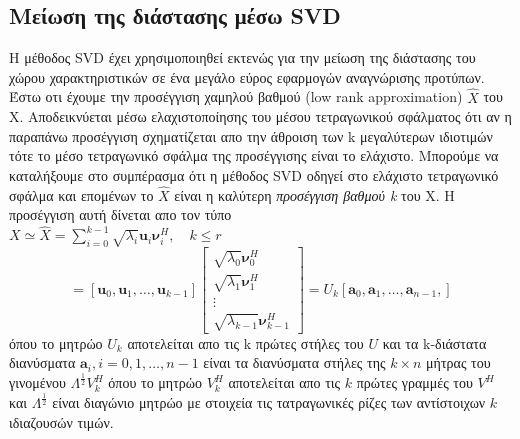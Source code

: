 \subsection{Μείωση της διάστασης μέσω \textlatin{SVD}}
\par
Η μέθοδος \textlatin{SVD} έχει χρησιμοποιηθεί εκτενώς για την μείωση της διάστασης του χώρου χαρακτηριστικών σε ένα μεγάλο εύρος εφαρμογών αναγνώρισης προτύπων. Έστω οτι έχουμε την προσέγγιση χαμηλού βαθμού \textlatin{(low rank approximation)} $ \hat{X} $ του \textlatin{X}. Αποδεικνύεται μέσω ελαχιστοποίησης του μέσου τετραγωνικού σφάλματος ότι αν η παραπάνω προσέγγιση σχηματίζεται απο την άθροιση των \textlatin{k} μεγαλύτερων ιδιοτιμών τότε το μέσο τετραγωνικό σφάλμα της προσέγγισης είναι το ελάχιστο. Μπορούμε να καταλήξουμε στο συμπέρασμα ότι η μέθοδος \textlatin{SVD} οδηγεί στο ελάχιστο τετραγωνικό σφάλμα και επομένων το $ \hat{X} $ είναι η καλύτερη \textit{προσέγγιση βαθμού \textlatin{k}} του \textlatin{X}. Η προσέγγιση αυτή δίνεται απο τον τύπο \\
\newline\hspace*{\fill}
$ X \simeq \hat{X} = \sum_{i=0}^{k-1} \sqrt{\lambda_{i}} \mathbf{u}_{i}\mathbf{\nu}_{i}^{H},\quad k \leq r $
\hspace*{\fill}\newline
\newline\hspace*{\fill}
\begin{equation}
	= [\mathbf{u}_{0},\mathbf{u}_{1},\ldots,\mathbf{u}_{k-1}]
	\begin{bmatrix}
	\sqrt{\lambda_{0}}\mathbf{\nu}_{0}^{H} \\
	\sqrt{\lambda_{1}}\mathbf{\nu}_{1}^{H} \\
	\vdots \\ 
	\sqrt{\lambda_{k-1}}\mathbf{\nu}_{k-1}^{H}
	\end{bmatrix} 
	= U_{k}[\mathbf{a}_{0},\mathbf{a}_{1},\ldots,\mathbf{a}_{n-1},]
\end{equation}
\hspace*{\fill}\newline
όπου το μητρώο $U_{k}$ αποτελείται απο τις \textlatin{k} πρώτες στήλες του $U$ και τα \textlatin{k}-διάστατα διανύσματα $\mathbf{a}_{i},i=0,1,\ldots,n-1$ είναι τα διανύσματα στήλες της $k \times n$ μήτρας του γινομένου $ \Lambda^{\frac{1}{2}}V_{k}^{H}$ όπου το μητρώο $V_{k}^{H}$ αποτελείται απο τις $k$ πρώτες γραμμές του $V^{H}$ και $ \Lambda^{\frac{1}{2}} $ είναι διαγώνιο μητρώο με στοιχεία τις τατραγωνικές ρίζες των αντίστοιχων $k$ ιδιαζουσών τιμών.
